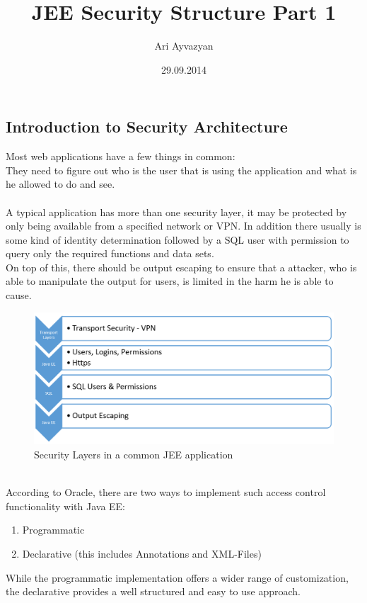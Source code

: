 \documentclass[12pt,a4paper]{report}
\date{29.09.2014}
\author{Ari Ayvazyan}
\title{JEE Security Structure Part 1}
\begin{document}
\maketitle
\tableofcontents


\chapter{\MyTitle}


\section{Introduction to Security Architecture}
Most web applications have a few things in common:\\
They need to figure out who is the user that is using the application and what is he allowed to do and see.\\\\
A typical application has more than one security layer, it may be protected by only being available from a specified network or VPN. In addition there usually is some kind of identity determination followed by a SQL user with permission to query only the required functions and data sets.\\
On top of this, there should be output escaping to ensure that a attacker, who is able to manipulate the output for users, is limited in the harm he is able to cause.
\begin{figure}[h]
\centering
\includegraphics[width=1\linewidth]{res/SecurityLayers}
\caption{Security Layers in a common JEE application}
\label{fig:SecurityLayers}

\end{figure}
\\According to Oracle\cite{oracleDoc}, there are two ways to implement such access control functionality with Java EE:
\begin{enumerate}
	\item Programmatic
	\item Declarative (this includes Annotations and XML-Files)
\end{enumerate}
While the programmatic implementation offers a wider range of customization, the declarative provides a well structured and easy to use approach.\\
\end{document}
